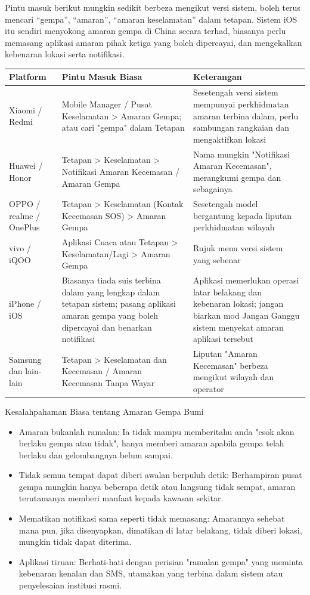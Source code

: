 
Pintu masuk berikut mungkin sedikit berbeza mengikut versi sistem, boleh terus mencari “gempa”, “amaran”, “amaran keselamatan” dalam tetapan. Sistem iOS itu sendiri menyokong amaran gempa di China secara terhad, biasanya perlu memasang aplikasi amaran pihak ketiga yang boleh dipercayai, dan mengekalkan kebenaran lokasi serta notifikasi.

\begin{center}
\begin{tabularx}{\linewidth}{|X|X|X|}
\hline
\textbf{Platform} & \textbf{Pintu Masuk Biasa} & \textbf{Keterangan} \tabularnewline
\hline
Xiaomi / Redmi & Mobile Manager / Pusat Keselamatan > Amaran Gempa; atau cari "gempa" dalam Tetapan & Sesetengah versi sistem mempunyai perkhidmatan amaran terbina dalam, perlu sambungan rangkaian dan mengaktifkan lokasi \tabularnewline
Huawei / Honor & Tetapan > Keselamatan > Notifikasi Amaran Kecemasan / Amaran Gempa & Nama mungkin "Notifikasi Amaran Kecemasan", merangkumi gempa dan sebagainya \tabularnewline
OPPO / realme / OnePlus & Tetapan > Keselamatan (Kontak Kecemasan SOS) > Amaran Gempa & Sesetengah model bergantung kepada liputan perkhidmatan wilayah \tabularnewline
vivo / iQOO & Aplikasi Cuaca atau Tetapan > Keselamatan/Lagi > Amaran Gempa & Rujuk menu versi sistem yang sebenar \tabularnewline
iPhone / iOS & Biasanya tiada suis terbina dalam yang lengkap dalam tetapan sistem; pasang aplikasi amaran gempa yang boleh dipercayai dan benarkan notifikasi & Aplikasi memerlukan operasi latar belakang dan kebenaran lokasi; jangan biarkan mod Jangan Ganggu sistem menyekat amaran aplikasi tersebut \tabularnewline
Samsung dan lain-lain & Tetapan > Keselamatan dan Kecemasan / Amaran Kecemasan Tanpa Wayar & Liputan "Amaran Kecemasan" berbeza mengikut wilayah dan operator \tabularnewline
\hline
\end{tabularx}
\end{center}

\begin{tcbwarn}{Kesalahpahaman Biasa tentang Amaran Gempa Bumi}
\begin{itemize}
  \item Amaran bukanlah ramalan: Ia tidak mampu memberitahu anda "esok akan berlaku gempa atau tidak", hanya memberi amaran apabila gempa telah berlaku dan gelombangnya belum sampai.
  \item Tidak semua tempat dapat diberi awalan berpuluh detik: Berhampiran pusat gempa mungkin hanya beberapa detik atau langsung tidak sempat, amaran terutamanya memberi manfaat kepada kawasan sekitar.
  \item Mematikan notifikasi sama seperti tidak memasang: Amarannya sehebat mana pun, jika disenyapkan, dimatikan di latar belakang, tidak diberi lokasi, mungkin tidak dapat diterima.
  \item Aplikasi tiruan: Berhati-hati dengan perisian "ramalan gempa" yang meminta kebenaran kenalan dan SMS, utamakan yang terbina dalam sistem atau penyelesaian institusi rasmi.
\end{itemize}

\end{tcbwarn}

